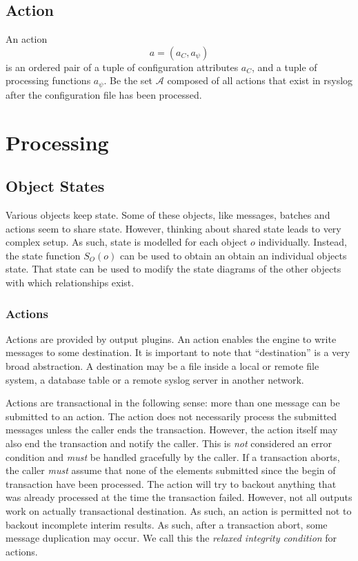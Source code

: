 \documentclass[a4paper,10pt]{article}
\newcommand{\AAA}{\mathcal{A}}
\begin{document}
\subsection{Action}
An action
$$a = (a_C, a_\psi)$$
is an ordered pair of a tuple of configuration attributes $a_C$, and a tuple of processing functions $a_\psi$. Be the set $\AAA$ composed of all actions that exist in rsyslog after the configuration file has been processed.


\section{Processing}
\subsection{Object States}
Various objects keep state. Some of these objects, like messages, batches and actions seem to share state. However, thinking about shared state leads to very complex setup. As such, state is modelled for each object $o$ individually. Instead, the state function $S_O(o)$ can be used to obtain an obtain an individual objects state. That state can be used to modify the state diagrams of the other objects with which relationships exist.

\subsubsection{Actions}
Actions are provided by output plugins. An action enables the engine to write messages to some destination. It is important to note that ``destination'' is a very broad abstraction. A destination may be a file inside a local or remote file system, a database table or a remote syslog server in another network.

Actions are transactional in the following sense: more than one message can be submitted to an action. The action does not necessarily process the submitted messages unless the caller ends the transaction. However, the action itself may also end the transaction and notify the caller. This is \emph{not} considered an error condition and \emph{must} be handled gracefully by the caller. If a transaction aborts, the caller \emph{must} assume that none of the elements submitted since the begin of transaction have been processed. The action will try to backout anything that was already processed at the time the transaction failed. However, not all outputs work on actually transactional destination. As such, an action is permitted not to backout incomplete interim results. As such, after a transaction abort, some message duplication may occur. We call this the \emph{relaxed integrity condition} for actions.
\end{document}

